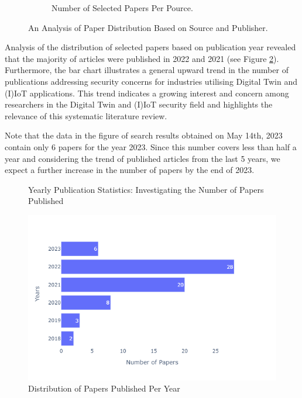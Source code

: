 \begin{figure}[H]
\begin{subfigure}[b]{0.45\textwidth}
        \caption{Number of Selected Papers Per Pource.}
    \end{subfigure}
    \caption{An Analysis of Paper Distribution Based on Source and Publisher.}
    \label{fig:archive-itemtype}
\end{figure}
 
Analysis of the distribution of selected papers based on publication year revealed that the majority of articles were published in 2022 and 2021 (see Figure \ref{fig:bar-chart-yaer}). Furthermore, the bar chart illustrates a general upward trend in the number of publications addressing security concerns for industries utilising Digital Twin and (I)IoT applications.  This trend indicates a growing interest and concern among researchers in the Digital Twin and (I)IoT security field and highlights the relevance of this systematic literature review.

Note that the data in the figure of search results obtained on May 14th, 2023 contain only 6 papers for the year 2023. Since this number covers less than half a year and considering the trend of published articles from the last 5 years, we expect a further increase in the number of papers by the end of 2023.

\begin{figure}[H]    
    \caption{Yearly Publication Statistics: Investigating the Number of Papers Published}
    \includegraphics[width=\textwidth]{images/newimages/barchart-year.png}
    \caption{Distribution of Papers Published Per Year}
    \label{fig:bar-chart-yaer}
\end{figure}

